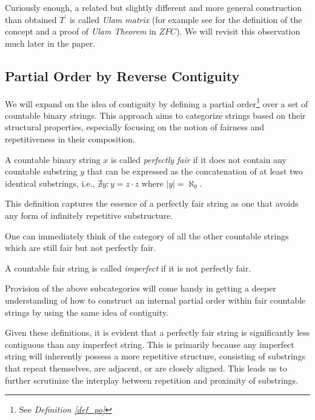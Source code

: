 Curiously enough, a related but slightly different and more general construction than obtained $T^\prime$ is called \textit{Ulam matrix} (for example see \cite{jech2003set} for the definition of the concept and a proof of \textit{Ulam Theorem} in $ZFC$). We will revisit this observation much later in the paper.

\subsection{Partial Order by Reverse Contiguity}


We will expand on the idea of contiguity by defining a partial order\footnote{See \textit{Definition \ref{def_po}}} over a set of countable binary strings. This approach aims to categorize strings based on their structural properties, especially focusing on the notion of fairness and repetitiveness in their composition.

\begin{definition}\label{def_pef_fair_str}
  A countable binary string $x$ is called \textit{perfectly fair} if it does not contain any countable substring $y$ that can be expressed as the concatenation of at least two identical substrings, i.e., $\nexists y : y = z \cdot z$ where $|y| = \aleph_0$.
\end{definition}

This definition captures the essence of a perfectly fair string as one that avoids any form of infinitely repetitive substructure.

One can immediately think of the category of all the other countable strings which are still fair but not perfectly fair.

\begin{definition}\label{def_imp_fair_str}
  A countable fair string is called \textit{imperfect} if it is not perfectly fair.
\end{definition}
  
Provision of the above subcategories will come handy in getting a deeper understanding of how to construct an internal partial order within fair countable strings by using the same idea of contiguity. 

Given these definitions, it is evident that a perfectly fair string is significantly less contiguous than any imperfect string. This is primarily because any imperfect string will inherently possess a more repetitive structure, consisting of substrings that repeat themselves, are adjacent, or are closely aligned. This leads us to further scrutinize the interplay between repetition and proximity of substrings.

